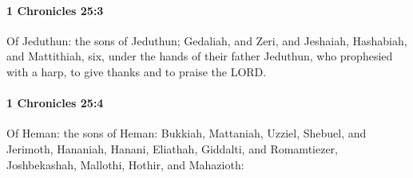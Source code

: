 		\paragraph{1 Chronicles 25:3} %
			\label{1CHRONICLES-25-3}

			Of Jeduthun: the sons of Jeduthun; Gedaliah, and Zeri, and Jeshaiah, Hashabiah, and Mattithiah, six, under the hands of their father Jeduthun, who prophesied with a harp, to give thanks and to praise the LORD.


		\paragraph{1 Chronicles 25:4} %
			\label{1CHRONICLES-25-4}

			Of Heman: the sons of Heman: Bukkiah, Mattaniah, Uzziel, Shebuel, and Jerimoth, Hananiah, Hanani, Eliathah, Giddalti, and Romamtiezer, Joshbekashah, Mallothi, Hothir, and Mahazioth:

